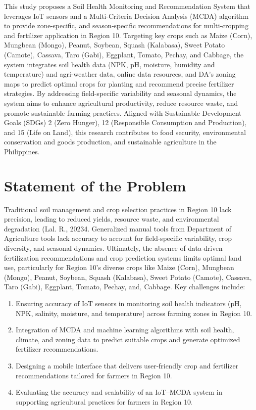 {This study proposes a Soil Health Monitoring and Recommendation System that leverages IoT sensors and a Multi-Criteria Decision Analysis (MCDA) algorithm to provide zone-specific, and season-specific recommendations for multi-cropping and fertilizer application in Region 10. Targeting key crops such as Maize (Corn), Mungbean (Mongo), Peanut, Soybean, Squash (Kalabasa), Sweet Potato (Camote), Cassava, Taro (Gabi), Eggplant, Tomato, Pechay, and Cabbage, the system integrates soil health data (NPK, pH, moisture, humidity and temperature) and agri-weather data, online data resources, and DA’s zoning maps to predict optimal crops for planting and recommend precise fertilizer strategies. By addressing field-specific variability and seasonal dynamics, the system aims to enhance agricultural productivity, reduce resource waste, and promote sustainable farming practices. Aligned with Sustainable Development Goals (SDGs) 2 (Zero Hunger), 12 (Responsible Consumption and Production), and 15 (Life on Land), this research contributes to food security, environmental conservation and goods production, and sustainable agriculture in the Philippines.


\section{Statement of the Problem}

Traditional soil management and crop selection practices in Region 10 lack precision, leading to reduced yields, resource waste, and environmental degradation (Lal. R., 20234. Generalized manual tools from Department of Agriculture tools lack accuracy to account for field-specific variability, crop diversity, and seasonal dynamics. Ultimately, the absence of data-driven fertilization recommendations and crop prediction systems limits optimal land use, particularly for Region 10’s diverse crops like Maize (Corn), Mungbean (Mongo), Peanut, Soybean, Squash (Kalabasa), Sweet Potato (Camote), Cassava, Taro (Gabi), Eggplant, Tomato, Pechay, and, Cabbage. Key challenges include:

\begin{enumerate}
	\item Ensuring accuracy of IoT sensors in monitoring soil health indicators (pH, NPK, salinity, moisture, and temperature) across farming zones in Region 10.
	\item Integration of MCDA and machine learning algorithms with soil health, climate, and zoning data to predict suitable crops and generate optimized fertilizer recommendations.
	\item Designing a mobile interface that delivers user-friendly crop and fertilizer recommendations tailored for farmers in Region 10.
	\item Evaluating the accuracy and scalability of an IoT–MCDA system in supporting agricultural practices for farmers in Region 10.
\end{enumerate}

}
